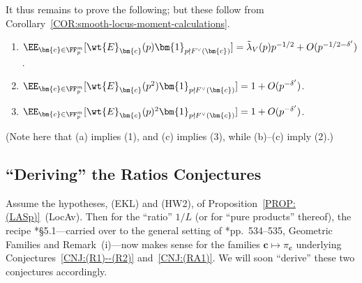 \documentclass[12pt]{report}
\begin{document}
{It thus remains to prove the following;
but these follow from Corollary~\ref{COR:smooth-locus-moment-calculations}.
\begin{enumerate}[{label=(\alph*)}]
    \item $\EE_{\bm{c}\in\FF_p^m}[\wt{E}_{\bm{c}}(p)
    \bm{1}_{p\nmid F^\vee(\bm{c})}]
    = \tilde{\lambda}_V(p)p^{-1/2}
    + O(p^{-1/2-\delta'})$.
    
    \item $\EE_{\bm{c}\in\FF_p^m}[\wt{E}_{\bm{c}}(p^2)
    \bm{1}_{p\nmid F^\vee(\bm{c})}]
    = 1 + O(p^{-\delta'})$.
    
    \item $\EE_{\bm{c}\in\FF_p^m}[\wt{E}_{\bm{c}}(p)^2
    \bm{1}_{p\nmid F^\vee(\bm{c})}]
    = 1 + O(p^{-\delta'})$.
\end{enumerate}
(Note here that (a) implies (1),
and (c) implies (3),
while (b)--(c) imply (2).)
}

\subsection{``Deriving'' the Ratios Conjectures}
\label{SUBSEC:applying-CFZ-ratios-conjecture-recipe}

Assume the hypotheses,
(EKL) and (HW2),
of Proposition~\ref{PROP:(LASp)}~(LocAv).
Then for the ``ratio'' $1/L$
(or for ``pure products'' thereof),
the recipe \cite{conrey2008autocorrelation}*{\S5.1}---carried over
to the general setting of \cite{sarnak2016families}*{pp.~534--535, Geometric Families and Remark~(i)}---now
makes sense for the families $\bm{c}\mapsto\pi_{\bm{c}}$ underlying Conjectures~\ref{CNJ:(R1)--(R2)} and~\ref{CNJ:(RA1)}.
We will soon ``derive'' these two conjectures accordingly.

\end{document}
